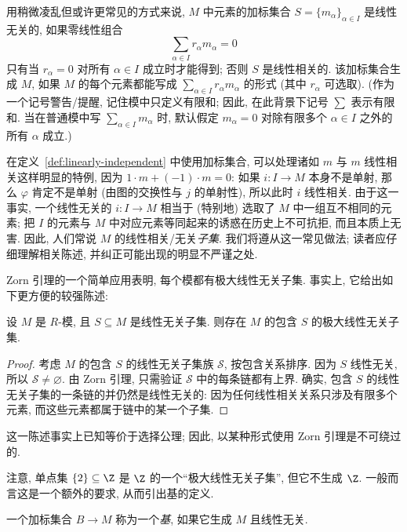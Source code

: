 用稍微凌乱但或许更常见的方式来说, $M$ 中元素的加标集合 $S=\{m_\alpha\}_{\alpha\in I}$ 是线性无关的, 如果零线性组合
\[
\sum_{\alpha\in I} r_\alpha m_\alpha = 0
\]
只有当 $r_\alpha=0$ 对所有 $\alpha\in I$ 成立时才能得到; 否则 $S$ 是线性相关的. 该加标集合生成 $M$, 如果 $M$ 的每个元素都能写成 $\sum_{\alpha\in I} r_\alpha m_\alpha$ 的形式 (其中 $r_\alpha$ 可选取). (作为一个记号警告/提醒, 记住模中只定义有限和; 因此, 在此背景下记号 $\sum$ 表示有限和. 当在普通模中写 $\sum_{\alpha\in I} m_\alpha$ 时, 默认假定 $m_\alpha=0$ 对除有限多个 $\alpha\in I$ 之外的所有 $\alpha$ 成立.)

在定义~\ref{def:linearly-independent} 中使用加标集合, 可以处理诸如 $m$ 与 $m$ 线性相关这样明显的特例, 因为 $1\cdot m + (-1)\cdot m = 0$: 如果 $i:I\to M$ 本身不是单射, 那么 $\varphi$ 肯定不是单射 (由图的交换性与 $j$ 的单射性), 所以此时 $i$ 线性相关. 由于这一事实, 一个线性无关的 $i:I\to M$ 相当于 (特别地) 选取了 $M$ 中一组互不相同的元素; 把 $I$ 的元素与 $M$ 中对应元素等同起来的诱惑在历史上不可抗拒, 而且本质上无害. 因此, 人们常说 $M$ 的线性相关/无关\emph{子集}. 我们将遵从这一常见做法; 读者应仔细理解相关陈述, 并纠正可能出现的明显不严谨之处.

Zorn 引理的一个简单应用表明, 每个模都有极大线性无关子集. 事实上, 它给出如下更方便的较强陈述:

\begin{lemma}\label{lem:maximal-lin-independent}
设 $M$ 是 $R$-模, 且 $S\subseteq M$ 是线性无关子集. 则存在 $M$ 的包含 $S$ 的极大线性无关子集.
\end{lemma}

\begin{proof}
考虑 $M$ 的包含 $S$ 的线性无关子集族 $\mathcal{S}$, 按包含关系排序. 因为 $S$ 线性无关, 所以 $\mathcal{S}\neq\varnothing$. 由 Zorn 引理, 只需验证 $\mathcal{S}$ 中的每条链都有上界. 确实, 包含 $S$ 的线性无关子集的一条链的并仍然是线性无关的: 因为任何线性相关关系只涉及有限多个元素, 而这些元素都属于链中的某一个子集.
\end{proof}

\begin{remark}\label{rmk:zorn-equivalent-choice}
这一陈述事实上已知等价于选择公理; 因此, 以某种形式使用 Zorn 引理是不可绕过的.
\end{remark}

注意, 单点集 $\{2\}\subseteq\Z$ 是 $\Z$ 的一个``极大线性无关子集'', 但它不生成 $\Z$. 一般而言这是一个额外的要求, 从而引出基的定义.

\begin{definition}\label{def:basis}
一个加标集合 $B\to M$ 称为一个\emph{基}, 如果它生成 $M$ 且线性无关.
\end{definition}

